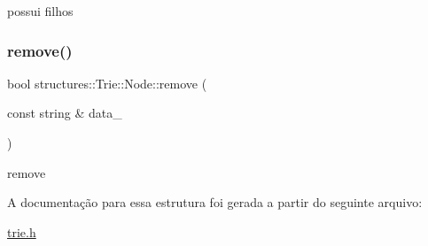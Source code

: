 possui filhos 

\mbox{\label{structstructures_1_1Trie_1_1Node_a977ee185cc90869cf5f9d8d945aadf46}} 
\subsubsection{\texorpdfstring{remove()}{remove()}}
{\footnotesize\ttfamily bool structures\+::\+Trie\+::\+Node\+::remove (\begin{DoxyParamCaption}\item[{const string \&}]{data\+\_\+ }\end{DoxyParamCaption})}



remove 



A documentação para essa estrutura foi gerada a partir do seguinte arquivo\+:\begin{DoxyCompactItemize}
\item 
\mbox{\hyperlink{trie_8h}{trie.\+h}}\end{DoxyCompactItemize}
